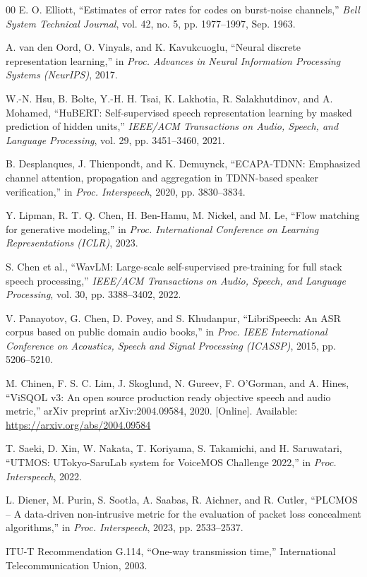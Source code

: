 \documentclass[lettersize,journal]{IEEEtran}
\begin{document}
\begin{thebibliography}{00}
 E. O. Elliott, ``Estimates of error rates for codes on burst-noise channels,'' \emph{Bell System Technical Journal}, vol. 42, no. 5, pp. 1977--1997, Sep. 1963.

 A. van den Oord, O. Vinyals, and K. Kavukcuoglu, ``Neural discrete representation learning,'' in \emph{Proc. Advances in Neural Information Processing Systems (NeurIPS)}, 2017.

 W.-N. Hsu, B. Bolte, Y.-H. H. Tsai, K. Lakhotia, R. Salakhutdinov, and A. Mohamed, ``HuBERT: Self-supervised speech representation learning by masked prediction of hidden units,'' \emph{IEEE/ACM Transactions on Audio, Speech, and Language Processing}, vol. 29, pp. 3451--3460, 2021.

 B. Desplanques, J. Thienpondt, and K. Demuynck, ``ECAPA-TDNN: Emphasized channel attention, propagation and aggregation in TDNN-based speaker verification,'' in \emph{Proc. Interspeech}, 2020, pp. 3830--3834.


 Y. Lipman, R. T. Q. Chen, H. Ben-Hamu, M. Nickel, and M. Le, ``Flow matching for generative modeling,'' in \emph{Proc. International Conference on Learning Representations (ICLR)}, 2023.

 S. Chen et al., ``WavLM: Large-scale self-supervised pre-training for full stack speech processing,'' \emph{IEEE/ACM Transactions on Audio, Speech, and Language Processing}, vol. 30, pp. 3388--3402, 2022.

 V. Panayotov, G. Chen, D. Povey, and S. Khudanpur, ``LibriSpeech: An ASR corpus based on public domain audio books,'' in \emph{Proc. IEEE International Conference on Acoustics, Speech and Signal Processing (ICASSP)}, 2015, pp. 5206--5210.

 M. Chinen, F. S. C. Lim, J. Skoglund, N. Gureev, F. O'Gorman, and A. Hines, ``ViSQOL v3: An open source production ready objective speech and audio metric,'' arXiv preprint arXiv:2004.09584, 2020. [Online]. Available: \url{https://arxiv.org/abs/2004.09584}

 T. Saeki, D. Xin, W. Nakata, T. Koriyama, S. Takamichi, and H. Saruwatari, ``UTMOS: UTokyo-SaruLab system for VoiceMOS Challenge 2022,'' in \emph{Proc. Interspeech}, 2022.

 L. Diener, M. Purin, S. Sootla, A. Saabas, R. Aichner, and R. Cutler, ``PLCMOS -- A data-driven non-intrusive metric for the evaluation of packet loss concealment algorithms,'' in \emph{Proc. Interspeech}, 2023, pp. 2533--2537.

 ITU-T Recommendation G.114, ``One-way transmission time,'' International Telecommunication Union, 2003.

\end{thebibliography}
\end{document}
